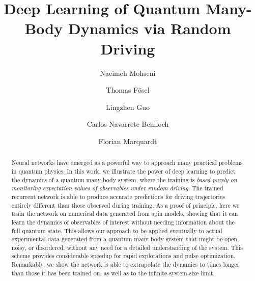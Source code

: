 \documentclass[a4paper,aps,amsmath,amssymb,twocolumn,longbibliography,,accepted=2022-05-17]{quantumarticle}
\begin{document}

\title{Deep Learning of Quantum Many-Body Dynamics via \newline Random Driving}
\author{Naeimeh Mohseni}
\author{Thomas Fösel}
\author{Lingzhen Guo}
\author{Carlos Navarrete-Benlloch}
\author{Florian Marquardt}
\maketitle
\begin{abstract}
    Neural networks have emerged as a powerful way to approach many practical problems in quantum physics. In this work, we illustrate the power of deep learning to predict the dynamics of a quantum many-body system, where the training is \textit{based purely on monitoring expectation values of observables under random driving}. The trained recurrent network is able to produce accurate predictions for driving trajectories entirely different than those observed during training. As a proof of principle, here we train the network on numerical data generated from spin models, showing that it can learn the dynamics of observables of interest without needing information about the full quantum state. This allows our approach to be applied eventually to actual experimental data generated from a quantum many-body system that might be open, noisy, or disordered, without any need for a detailed understanding of the system. This scheme provides considerable speedup for rapid explorations and pulse optimization. Remarkably, we show the network is able to extrapolate the dynamics to times longer than those it has been trained on, as well as to the infinite-system-size limit.
\end{abstract}
\end{document}
